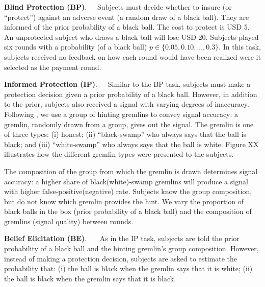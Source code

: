 \documentclass[12pt,a4paper]{article}
\begin{document}
\bigskip
\noindent\textbf{Blind Protection (BP)}.\ \ \ Subjects must decide whether to insure (or “protect”) against an adverse event (a random draw of a black ball).  They are informed of the prior probability of a black ball. The cost to protect is USD 5. An unprotected subject who draws a black ball will lose USD 20. Subjects played six rounds with a probability (of a black ball) $p \in \{0.05,0.10,...,0.3\}$. In this task, subjects received no feedback on how each round would have been realized were it selected as the payment round.

\bigskip
\noindent\textbf{Informed Protection (IP)}.\ \ \ Similar to the BP task, subjects must make a protection decision given a prior probability of a black ball. However, in addition to the prior, subjects also received a signal with varying degrees of inaccuracy. Following \citet{coutts_good_2019}, we use a group of hinting gremlins to convey signal accuracy: a gremlin, randomly drawn from a group, gives out the signal. The gremlin is one of three types: (i) honest; (ii) ``black-swamp'' who always says that the ball is black; and (iii) ``white-swamp'' who always says that the ball is white. Figure XX illustrates how the different gremlin types were presented to the subjects. 

The composition of the group from which the gremlin is drawn determines signal accuracy: a higher share of black(white)-swamp gremlins will produce a signal with higher false-positive(negative) rate. Subjects know the group composition, but do not know which gremlin provides the hint. We vary the proportion of black balls in the box (prior probability of a black ball) and the composition of gremlins (signal quality) between rounds.  

\bigskip
\noindent\textbf{Belief Elicitation (BE)}.\ \ \ 
As in the IP task, subjects are told the prior probability of a black ball and the hinting gremlin's group composition. However, instead of making a protection decision, subjects are asked to estimate the probability that: (i) the ball is black when the gremlin says that it is white; (ii) the ball is black when the gremlin says that it is black. 
\end{document}
